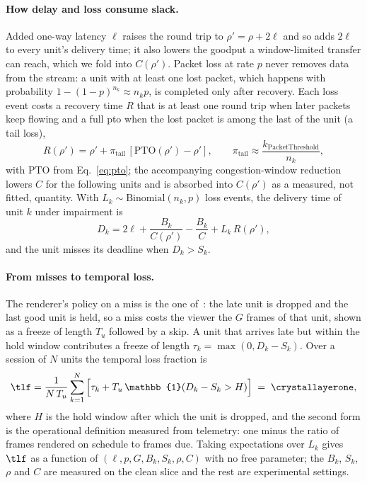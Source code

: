 \paragraph{How delay and loss consume slack.}
Added one-way latency $\ell$ raises the round trip to $\rho' = \rho +
2\ell$ and so adds $2\ell$ to every unit's delivery time; it also
lowers the goodput a window-limited transfer can reach, which we fold
into $C(\rho')$. Packet loss at rate $p$ never removes data from the
stream: a unit with at least one lost packet, which happens with
probability $1 - (1-p)^{n_k} \approx n_k p$, is completed only after
recovery. Each loss event costs a recovery time $R$ that is at least
one round trip when later packets keep flowing and a full \gls{pto}
when the lost packet is among the last of the unit (a tail loss),
\begin{equation}
  R(\rho') = \rho' + \pi_{\mathrm{tail}}\,[\mathrm{PTO}(\rho') - \rho'],
  \qquad \pi_{\mathrm{tail}} \approx \frac{k_{\mathrm{PacketThreshold}}}{n_k},
  \label{eq:recovery}
\end{equation}
with $\mathrm{PTO}$ from Eq.~\eqref{eq:pto}; the accompanying
congestion-window reduction lowers $C$ for the following units and is
absorbed into $C(\rho')$ as a measured, not fitted, quantity. With
$L_k \sim \mathrm{Binomial}(n_k, p)$ loss events, the delivery time of
unit $k$ under impairment is
\begin{equation}
  D_k = 2\ell + \frac{B_k}{C(\rho')} - \frac{B_k}{C} + L_k\, R(\rho'),
  \label{eq:delay}
\end{equation}
and the unit misses its deadline when $D_k > S_k$.

\paragraph{From misses to temporal loss.}
The renderer's policy on a miss is the one of~\cite{mosaic2026}: the
late unit is dropped and the last good unit is held, so a miss costs
the viewer the $G$ frames of that unit, shown as a freeze of length
$T_u$ followed by a skip. A unit that arrives late but within the
hold window contributes a freeze of length $\tau_k = \max(0, D_k -
S_k)$. Over a session of $N$ units the temporal loss fraction is
\begin{equation}
  \tlf = \frac{1}{N\,T_u}\sum_{k=1}^{N}\Big[\tau_k + T_u\,\mathbb{1}(D_k - S_k > H)\Big]
  \;=\; \crystallayerone,
  \label{eq:tlf}
\end{equation}
where $H$ is the hold window after which the unit is dropped, and the
second form is the operational definition measured from telemetry: one
minus the ratio of frames rendered on schedule to frames due. Taking
expectations over $L_k$ gives $\tlf$ as a function of
$(\ell, p, G, B_k, S_k, \rho, C)$ with no free parameter; the
$B_k$, $S_k$, $\rho$ and $C$ are measured on the clean slice and the
rest are experimental settings.

